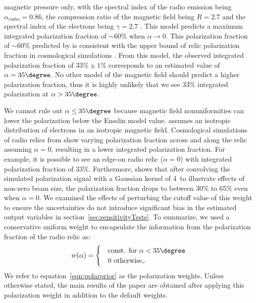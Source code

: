 \documentclass[letterpaper,useAMS,usenatbib]{mn2e}
\begin{document}
magnetic pressure only, with the spectral index of the radio
emission being $\alpha_{radio} = 0.86$, the compression ratio of the
magnetic field being
$R=2.7$ and the spectral index of the electrons being $\gamma = 2.7$
\citep{L13}. 
This model predicts a maximum integrated polarization fraction 
 of
$\sim60\%$ when $\alpha \rightarrow 0$. 
This  polarization fraction of $\sim60\%$ predicted by \citep{E98} is
consistent with the upper bound of relic polarization fraction in cosmological
simulations \citep{S13}. From this model, the
observed integrated polarization fraction of $33\%\pm1\%$ corresponds to an estimated value
of $\alpha  = 35\degree$. 
No other model of the magnetic field should predict 
a higher polarization fraction, thus it is highly unlikely that we see 33\%
integrated polarization at $\alpha > 35\degree$.  
\par

We cannot rule out $\alpha \leq 35\degree$ because magnetic field
nonuniformities can lower the polarization below the Ensslin model value.
\cite{E98} assumes an isotropic distribution of electrons in an isotropic magnetic field. Cosmological
simulations of radio relics from \cite{S13} show varying polarization
fraction across and along the relic assuming $\alpha = 0$, resulting in a
lower integrated polarization fraction. For example, it is possible to see 
an edge-on radio relic ($\alpha = 0$) with integrated polarization fraction of 33\%. 
Furthermore, \cite{S13} shows that after convolving the
simulated polarization signal with a Gaussian kernel of 4\arcmin~to
illustrate effects of non-zero beam size, the polarization fraction drops
to between 30\% to 65\% even when $\alpha = 0$. We examined the effects of perturbing
the cutoff value of this weight to ensure the uncertainties do not
introduce significant bias in the estimated output variables in
section~\ref{sec:sensitivityTests}.
To summarize, we used a conservative uniform weight to encapsulate the
information from the polarization fraction of the radio relic as:
\begin{equation}
w(\alpha) = 
	\begin{cases}
	& \text{const. for  }\alpha < 35 \degree \\ 
	& 0 \text{ otherwise,}\label{eqn:polarprior}.
	\end{cases}
\end{equation}
We refer to equation~\ref{eqn:polarprior} as the polarization weights. Unless
otherwise stated, the main results of the paper are obtained after applying
this polarization weight in addition to the default weights.
\end{document}
